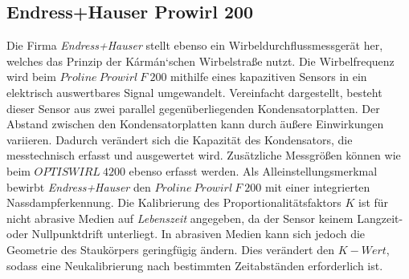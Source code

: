 \subsection{Endress+Hauser Prowirl 200}
Die Firma \textit{Endress+Hauser} stellt ebenso ein Wirbeldurchflussmessgerät her, welches das Prinzip der K\'{a}rm\'{a}n`schen Wirbelstraße nutzt. Die Wirbelfrequenz wird beim  $Proline \: Prowirl \: F \: 200$ mithilfe eines kapazitiven Sensors in ein elektrisch auswertbares Signal umgewandelt. Vereinfacht dargestellt, besteht dieser Sensor aus zwei parallel gegenüberliegenden Kondensatorplatten. Der Abstand zwischen den Kondensatorplatten kann durch äußere Einwirkungen variieren. Dadurch verändert sich die Kapazität des Kondensators, die messtechnisch erfasst und ausgewertet wird. Zusätzliche Messgrößen können wie beim $OPTISWIRL \: 4200$ ebenso erfasst werden. Als Alleinstellungsmerkmal bewirbt \textit{Endress+Hauser} den $Proline \: Prowirl \: F \: 200$ mit einer integrierten Nassdampferkennung. Die Kalibrierung des Proportionalitätsfaktors $K$ ist für nicht abrasive Medien auf \textit{\glqq Lebenszeit\grqq{}} angegeben, da der Sensor keinem Langzeit- oder Nullpunktdrift unterliegt. In abrasiven Medien kann sich jedoch die Geometrie des Staukörpers geringfügig ändern. Dies verändert den $K-Wert$, sodass eine Neukalibrierung nach bestimmten Zeitabständen erforderlich ist.\autocites[vgl.][476 \psq]{Sensortechnik}[vgl.][4 \psq]{Prowirl}

